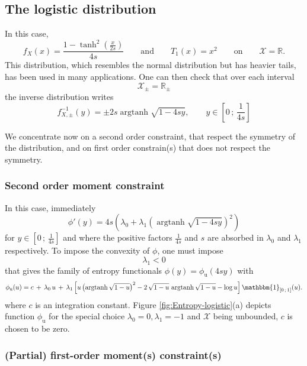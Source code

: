 \documentclass[english,sort&compress]{elsarticle}
\theoremstyle{definition}
\theoremstyle{plain}
\theoremstyle{plain}
\def\Rset{\mathbb{R}}
\def\X{\mathcal{X}}
\def\un{\mathbbm{1}}
\def\argtanh{\operatorname{argtanh}}
\begin{document}

\subsection{The logistic distribution}
\label{subsec:Logistic}

In this case, 
%
\[
f_X(x)  = \frac{1  -  \tanh^2\!\left(\frac{x}{2s}\right)}{4s} \qquad  \mbox{and}
\qquad T_1(x) = x^2 \qquad \mbox{on} \qquad \X = \Rset.
\]
This  distribution, which  resembles  the normal  distribution  but has  heavier
tails, has  been used in  many applications. One  can then check that  over each
interval
%
\[
\X_\pm = \Rset_\pm
\]
%
the inverse distribution writes 
%
\[
f_{X,\pm}^{-1}(y) = \pm 2 s \argtanh \sqrt{1-4sy}, \qquad y \in \left[ 0 \, ; \,
  \frac{1}{4s} \right]
\]

We concentrate  now on a second  order constraint, that respect  the symmetry of
the  distribution, and on  first order  constrain(s) that  does not  respect the
symmetry.



\subsubsection{Second order moment constraint}

In this case, immediately 
%
\[
\phi'(y)  =  4  s  \left(  \lambda_0  +  \lambda_1  \left(  \argtanh\sqrt{1-4sy}
  \right)^2 \right)
\]
%
for $y \in \left[ 0 \, ; \, \frac{1}{4s} \right]$ and where the positive factors
$\frac{1}{4   s}$  and  $s$   are  absorbed   in  $\lambda_0$   and  $\lambda_1$
respectively.  To impose the convexity of $\phi$, one must impose
%
\[
\lambda_1 < 0
\]
%
that gives  the family of  entropy functionals $\phi(y) =  \phi_{\mathrm{u}}(4 s
y)$ with
%
\[
\phi_{\mathrm{u}}(u) = c \,  + \,  \lambda_0 \, u  \, +  \, \lambda_1  \left[ u
  \left( \argtanh\sqrt{1-u} \right)^2 -  2 \, \sqrt{1-u} \, \argtanh\sqrt{1-u} -
  \log u \right] \un_{\left[ 0 \, ; \, 1 \right]}(u).
\]
%
where  $c$  is an  integration  constant.  Figure  \ref{fig:Entropy-logistic}(a)
depicts  function $\phi_{\mathrm{u}}$  for the  special choice  $\lambda_0  = 0,
\lambda_1 = -1$ and $\X$ being unbounded, $c$ is chosen to be zero.



\subsubsection{(Partial) first-order moment(s) constraint(s)}
\end{document}
